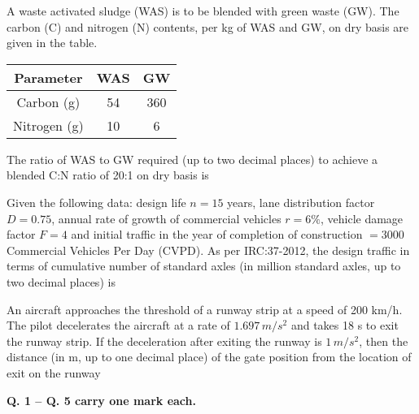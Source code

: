 \iffalse
\chapter{2018}
\author{EE24BTECH11059}
\section{ce}
\fi
	\item{
		A waste activated sludge (WAS) is to be blended with green waste (GW). The carbon (C) and nitrogen (N) contents, per kg of WAS and GW, on dry basis are given in the table.
		\begin{center}
		\begin{tabular}{|c|c|c|}
			\hline
			Parameter & WAS & GW \\ \hline
			Carbon (g) & 54 & 360 \\ \hline
			Nitrogen (g) & 10 & 6 \\
			\hline
		\end{tabular}
		\end{center}
		The ratio of WAS to GW required (up to two decimal places) to achieve a blended C:N ratio of 20:1 on dry basis is \underline{\hspace{1.5cm}}
	}
   	\item{
    	Given the following data: design life \( n = 15 \) years, lane distribution factor \( D = 0.75 \), annual rate of growth of commercial vehicles \( r = 6\% \), vehicle damage factor \( F = 4 \) and initial traffic in the year of completion of construction \( = 3000 \) Commercial Vehicles Per Day (CVPD). As per IRC:37-2012, the design traffic in terms of cumulative number of standard axles (in million standard axles, up to two decimal places) is \underline{\hspace{1.5cm}}
    }
    \item{
            An aircraft approaches the threshold of a runway strip at a speed of 200 km/h. The pilot decelerates the aircraft at a rate of \(1.697 \, m/s^2\) and takes 18 s to exit the runway strip. If the deceleration after exiting the runway is \(1 \, m/s^2\), then the distance (in m, up to one decimal place) of the gate position from the location of exit on the runway \underline{\hspace{1.5cm}}
        }
    \item[]{
    \textbf{Q. 1 – Q. 5 carry one mark each.}}
